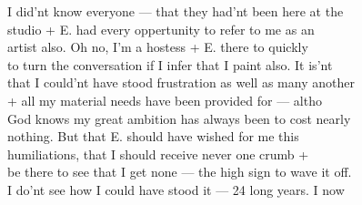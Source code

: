 \documentclass[11pt,a4paper]{article}
\begin{document}
{I did'nt know everyone --- that they had'nt been here at the \\
studio + E. had every oppertunity to refer to me as an \\
artist also. Oh no, I'm a hostess + E. there to quickly \\
to turn the conversation if I infer that I paint also. It is'nt \\
that I could'nt have stood frustration as well as many another \\
+ all my material needs have been provided for --- altho \\
God knows my great ambition has always been to cost nearly \\
nothing. But that E. should have wished for me this \\
humiliations, that I should receive never one crumb + \\
be there to see that I get none --- the high sign to wave it off. \\
I do'nt see how I could have stood it --- 24 long years. I now}

\end{document}
